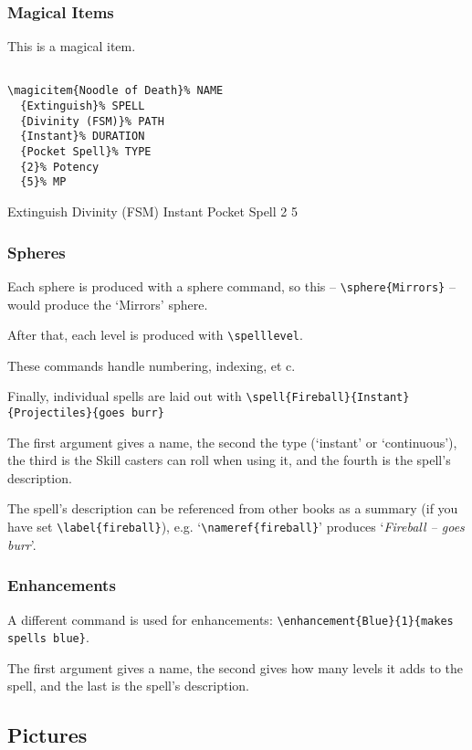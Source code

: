 \documentclass[a4paper,openany]{book}
\begin{document}
\begin{multicols}{2}
\subsubsection{Magical Items}

This is a magical item.

\begin{verbatim}

\magicitem{Noodle of Death}% NAME
  {Extinguish}% SPELL
  {Divinity (FSM)}% PATH
  {Instant}% DURATION
  {Pocket Spell}% TYPE
  {2}% Potency
  {5}% MP

\end{verbatim}

  {Extinguish}%
  {Divinity (FSM)}%
  {Instant}%
  {Pocket Spell}%
  {2}%
  {5}%

\subsubsection{Spheres}

Each sphere is produced with a sphere command, so this -- \verb"\sphere{Mirrors}" -- would produce the `Mirrors' sphere.

After that, each level is produced with \verb"\spelllevel".

These commands handle numbering, indexing, et c.

Finally, individual spells are laid out with \verb"\spell{Fireball}{Instant}{Projectiles}{goes burr}"

The first argument gives a name, the second the type (`instant' or `continuous'), the third is the Skill casters can roll when using it, and the fourth is the spell's description.

The spell's description can be referenced from other books as a summary (if you have set \verb"\label{fireball}"), e.g. `\verb"\nameref{fireball}"' produces `\textit{Fireball -- goes burr}'.

\subsubsection{Enhancements}
A different command is used for enhancements: \verb"\enhancement{Blue}{1}{makes spells blue}".

The first argument gives a name, the second gives how many levels it adds to the spell, and the last is the spell's description.

\subsection{Pictures}


\end{multicols}
\end{document}
